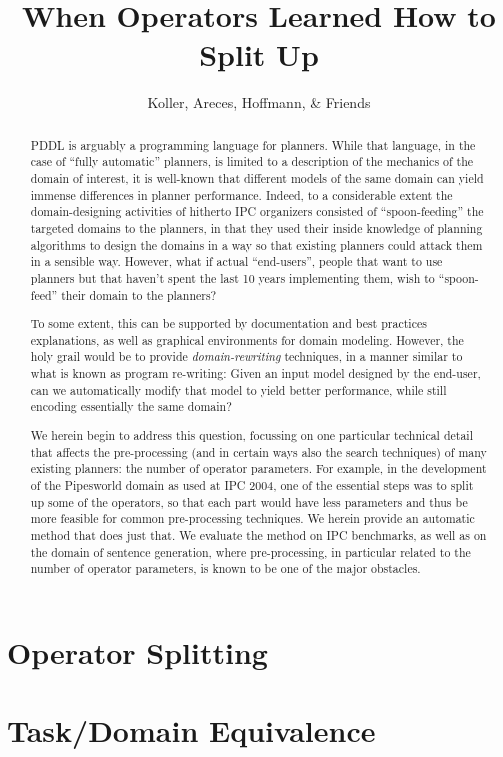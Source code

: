 \documentclass{llncs}
\title{When Operators Learned How to Split Up}
\author{Koller, Areces, Hoffmann, \& Friends}
\institute{I'm sure they're working somewhere \dots}
\begin{document}
\maketitle


\begin{abstract}
PDDL is arguably a programming language for planners. While that
language, in the case of ``fully automatic'' planners, is limited to a
description of the mechanics of the domain of interest, it is
well-known that different models of the same domain can yield immense
differences in planner performance. Indeed, to a considerable extent
the domain-designing activities of hitherto IPC organizers consisted
of ``spoon-feeding'' the targeted domains to the planners, in that
they used their inside knowledge of planning algorithms to design the
domains in a way so that existing planners could attack them in a
sensible way. However, what if actual ``end-users'', people that want
to use planners but that haven't spent the last 10 years implementing
them, wish to ``spoon-feed'' their domain to the planners?

To some extent, this can be supported by documentation and best
practices explanations, as well as graphical environments for domain
modeling. However, the holy grail would be to provide
\emph{domain-rewriting} techniques, in a manner similar to what is
known as program re-writing: Given an input model designed by the
end-user, can we automatically modify that model to yield better
performance, while still encoding essentially the same domain?

We herein begin to address this question, focussing on one particular
technical detail that affects the pre-processing (and in certain ways
also the search techniques) of many existing planners: the number of
operator parameters. For example, in the development of the Pipesworld
domain as used at IPC 2004, one of the essential steps was to split up
some of the operators, so that each part would have less parameters
and thus be more feasible for common pre-processing techniques. We
herein provide an automatic method that does just that. We evaluate
the method on IPC benchmarks, as well as on the domain of sentence
generation, where pre-processing, in particular related to the number
of operator parameters, is known to be one of the major obstacles.
\end{abstract}




\setcounter{tocdepth}{4}

\tableofcontents





\section{Operator Splitting}








\section{Task/Domain Equivalence}












\end{document}

